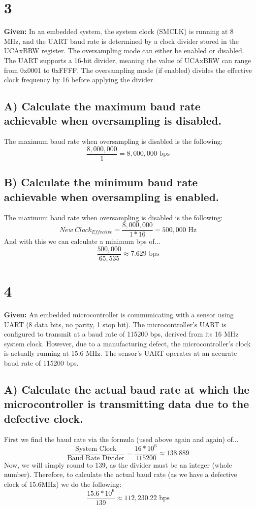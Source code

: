 \documentclass{article}
\begin{document}
\pagebreak
\section{3}
\textbf{Given:} In an embedded system, the system clock (SMCLK) is running at 8 MHz, and the UART baud rate is determined by a clock divider stored in the UCAxBRW register. The oversampling mode can either be enabled or disabled. The UART supports a 16-bit divider, meaning the value of UCAxBRW can range from 0x0001 to 0xFFFF. The oversampling mode (if enabled) divides the effective clock frequency by 16 before applying the divider.

\subsection{A) Calculate the maximum baud rate achievable when oversampling is disabled.}
The maximum baud rate when oversampling is disabled is the following:
$$ \frac{8,000,000}{1}  = 8,000,000\text{ bps}$$

\subsection{B) Calculate the minimum baud rate achievable when oversampling is enabled.}
The maximum baud rate when oversampling is disabled is the following:
$$ {New\ Clock}_{Effective} = \frac{8,000,000}{1*16}  = 500,000\text{ Hz}$$
And with this we can calculate a minimum bps of...
$$ \frac{500,000}{65,535} \approx 7.629\text{ bps} $$

\section{4}
\textbf{Given:} An embedded microcontroller is communicating with a sensor using UART (8 data bits, no parity, 1 stop bit). The microcontroller’s UART is configured to transmit at a baud rate of 115200 bps, derived from its 16 MHz system clock. However, due to a manufacturing defect, the microcontroller’s clock is actually running at 15.6 MHz. The sensor’s UART operates at an accurate baud rate of 115200 bps.

\subsection{A) Calculate the actual baud rate at which the microcontroller is transmitting data due to the defective clock.}
First we find the baud rate via the formula (used above again and again) of... 
$$\frac{\text{System Clock}}{\text{Baud Rate Divider}} = \frac{16*10^6}{115200} \approx 138.889 $$
Now, we will simply round to 139, as the divider must be an integer (whole number). Therefore, to calculate the actual baud rate (as we have a defective clock of 15.6MHz) we do the following:
$$ \frac{15.6*10^6}{139} \approx 112,230.22\text{ bps}$$
\end{document}
